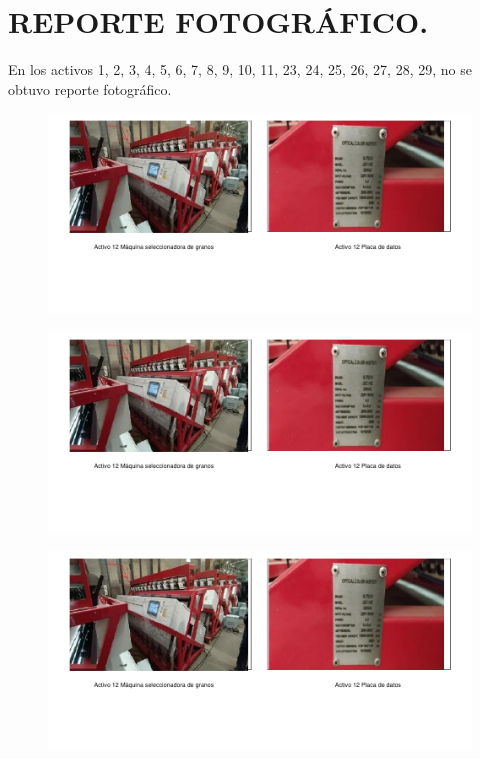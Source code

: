 \chapter{REPORTE FOTOGRÁFICO.} %

En los activos 1, 2, 3, 4, 5, 6, 7, 8, 9, 10, 11, 23, 24, 25, 26, 27, 28, 29, no se obtuvo reporte fotográfico.

\begin{figure}[hbtp!]
	\centering
	\includegraphics[width=  \linewidth, page = 1]{../0.imagenes/CAP_12/cap_12}
\end{figure}
\newpage

\begin{figure}[hbtp!]
	\centering
	\includegraphics[width=  \linewidth, page = 2]{../0.imagenes/CAP_12/cap_12}
\end{figure}
\newpage

\begin{figure}[hbtp!]
	\centering
	\includegraphics[width=  \linewidth, page = 3]{../0.imagenes/CAP_12/cap_12}
\end{figure}
\newpage

